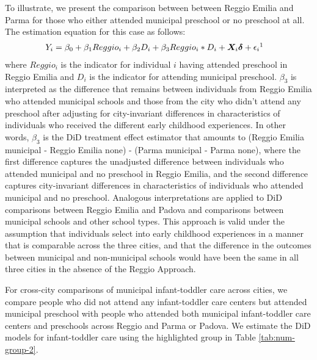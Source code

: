 To illustrate, we present the comparison between between Reggio Emilia and Parma for those who either attended municipal preschool or no preschool at all. The estimation equation for this case as follows:
\begin{eqnarray}\label{eq:specific2}
Y_i & = \beta_0 + \beta_1 Reggio_i + \beta_2 D_i + \beta_3 Reggio_i * D_i + \bm{X}_i \bm{\delta} + \epsilon_i\footnotemark
\end{eqnarray}
\hspace{-1.25mm}where $Reggio_i$ is the indicator for individual $i$ having attended preschool in Reggio Emilia and $D_i$ is the indicator for attending municipal preschool. $\beta_3$ is interpreted as the difference that remains between individuals from Reggio Emilia who attended municipal schools and those from the city who didn't attend any preschool after adjusting for city-invariant differences in characteristics of individuals who received the different early childhood experiences. In other words, $\beta_3$ is the DiD treatment effect estimator that amounts to (Reggio Emilia municipal - Reggio Emilia none) - (Parma municipal - Parma none), where the first difference captures the unadjusted difference between individuals who attended municipal and no preschool in Reggio Emilia, and the second difference captures city-invariant differences in characteristics of individuals who attended municipal and no preschool. Analogous interpretations are applied to DiD comparisons between Reggio Emilia and Padova and comparisons between municipal schools and other school types. This approach is valid under the assumption that individuals select into early childhood experiences in a manner that is comparable across the three cities, and that the difference in the outcomes between municipal and non-municipal schools would have been the same in all three cities in the absence of the Reggio Approach.

For cross-city comparisons of municipal infant-toddler care across cities, we compare people who did not attend any infant-toddler care centers but attended municipal preschool with people who attended both municipal infant-toddler care centers and preschools across Reggio and Parma or Padova. We estimate the DiD models for infant-toddler care using the highlighted group in Table \ref{tab:num-group-2}.

